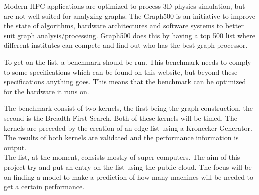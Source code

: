Modern HPC applications are optimized to process 3D physics simulation, but are not well suited for analyzing graphs. The Graph500 \cite{murphy2010introducing} is an initiative to improve the state of algorithms, hardware architectures and software systems to better suit graph analysis/processing. Graph500 does this by having a top 500 list where different institutes can compete and find out who has the best graph processor.

To get on the list, a benchmark should be run. This benchmark needs to comply to some specifications which can be found on this website\cite{graph500-specs}, but beyond these specifications anything goes. This means that the benchmark can be optimized for the hardware it runs on. 

The benchmark consist of two kernels, the first being the graph construction, the second is the Breadth-First Search. Both of these kernels will be timed. The kernels are preceded by the creation of an edge-list using a Kronecker Generator\cite{leskovec2010kronecker}. The results of both kernels are validated and the performance information is output.
\\
The list, at the moment, consists mostly of super computers. The aim of this project try and put an entry on the list using the public cloud. The focus will be on finding a model to make a prediction of how many machines will be needed to get a certain performance.